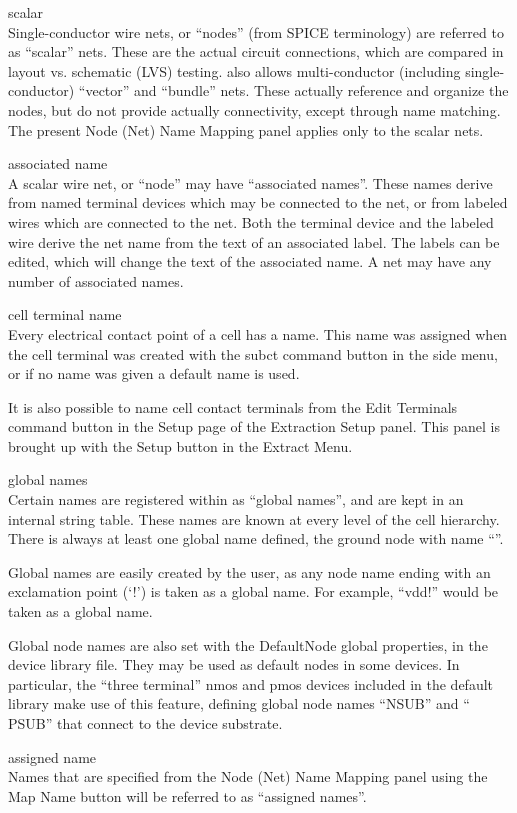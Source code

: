 \begin{description}
\item{scalar}\\
Single-conductor wire nets, or ``nodes'' (from SPICE terminology) are
referred to as ``scalar'' nets.  These are the actual circuit
connections, which are compared in layout vs.  schematic (LVS)
testing.  {\Xic} also allows multi-conductor (including
single-conductor) ``vector'' and ``bundle'' nets.  These actually
reference and organize the nodes, but do not provide actually
connectivity, except through name matching.  The present {\cb Node
(Net) Name Mapping} panel applies only to the scalar nets.

\item{associated name}\\
A scalar wire net, or ``node'' may have ``associated names''.  These
names derive from named terminal devices which may be connected to the
net, or from labeled wires which are connected to the net.  Both the
terminal device and the labeled wire derive the net name from the text
of an associated label.  The labels can be edited, which will change
the text of the associated name.  A net may have any number of
associated names.

\item{cell terminal name}\\
Every electrical contact point of a cell has a name.  This name was
assigned when the cell terminal was created with the {\cb subct}
command button in the side menu, or if no name was given a default
name is used.

It is also possible to name cell contact terminals from the {\cb Edit
Terminals} command button in the {\cb Setup} page of the {\cb
Extraction Setup} panel.  This panel is brought up with the {\cb
Setup} button in the {\cb Extract Menu}.

\item{global names}\\
Certain names are registered within {\Xic} as ``global names'',
and are kept in an internal string table.  These names are known
at every level of the cell hierarchy.  There is always at least
one global name defined, the ground node with name ``{}''.

Global names are easily created by the user, as any node name ending
with an exclamation point (`{\vt !}') is taken as a global name.
For example, ``{\vt vdd!}'' would be taken as a global name.

Global node names are also set with the {\et DefaultNode} global
properties, in the device library file.  They may be used as default
nodes in some devices.  In particular, the ``three terminal'' {\cb
nmos} and {\cb pmos} devices included in the default library make use
of this feature, defining global node names ``{\vt NSUB}'' and ``{\vt
PSUB}'' that connect to the device substrate.

\item{assigned name}\\
Names that are specified from the {\cb Node (Net) Name Mapping} panel
using the {\cb Map Name} button will be referred to as ``assigned
names''.
\end{description}

